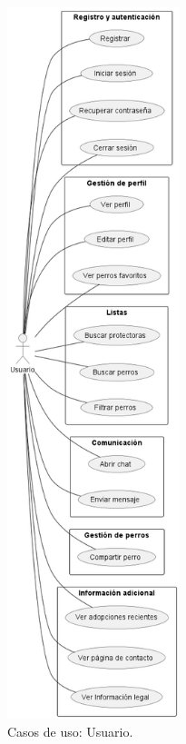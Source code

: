 \documentclass[a4paper, 12pt]{article}
\begin{document}
\begin{figure}[H]
	\begin{center}
		{\includegraphics[width=5cm]{diagram/UserC.png}\par}
		\caption{Casos de uso: Usuario.}
	\end{center}
\end{figure}
\end{document}
